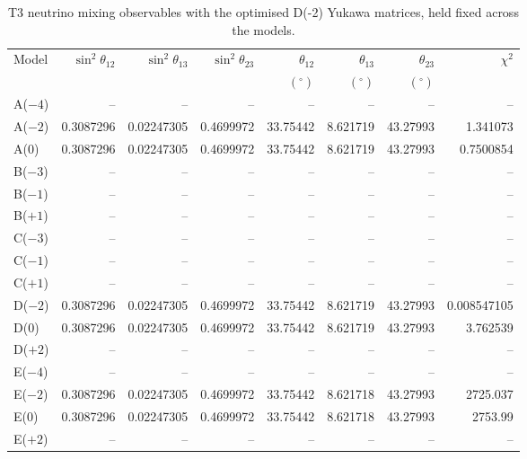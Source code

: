 \begin{table}[p]
\centering
\caption{T3 neutrino mixing observables with the optimised D(-2) Yukawa matrices, held fixed across the models.}
\label{tab:appC_Dm2_mixing}
\begingroup
\footnotesize
\setlength{\tabcolsep}{3.2pt}
\begin{tabular}{lrrrrrrr}
\hline
Model & $\sin^2\theta_{12}$ & $\sin^2\theta_{13}$ & $\sin^2\theta_{23}$ & $\theta_{12}$ & $\theta_{13}$ & $\theta_{23}$ & $\chi^2$ \\
 &  &  &  & $(^\circ)$ & $(^\circ)$ & $(^\circ)$ &  \\
\hline
A($-4$) & -- & -- & -- & -- & -- & -- & -- \\
A($-2$) & 0.3087296 & 0.02247305 & 0.4699972 & 33.75442 & 8.621719 & 43.27993 & 1.341073 \\
A($0$) & 0.3087296 & 0.02247305 & 0.4699972 & 33.75442 & 8.621719 & 43.27993 & 0.7500854 \\
B($-3$) & -- & -- & -- & -- & -- & -- & -- \\
B($-1$) & -- & -- & -- & -- & -- & -- & -- \\
B($+1$) & -- & -- & -- & -- & -- & -- & -- \\
C($-3$) & -- & -- & -- & -- & -- & -- & -- \\
C($-1$) & -- & -- & -- & -- & -- & -- & -- \\
C($+1$) & -- & -- & -- & -- & -- & -- & -- \\
D($-2$) & 0.3087296 & 0.02247305 & 0.4699972 & 33.75442 & 8.621719 & 43.27993 & 0.008547105 \\
D($0$) & 0.3087296 & 0.02247305 & 0.4699972 & 33.75442 & 8.621719 & 43.27993 & 3.762539 \\
D($+2$) & -- & -- & -- & -- & -- & -- & -- \\
E($-4$) & -- & -- & -- & -- & -- & -- & -- \\
E($-2$) & 0.3087296 & 0.02247305 & 0.4699972 & 33.75442 & 8.621718 & 43.27993 & 2725.037 \\
E($0$) & 0.3087296 & 0.02247305 & 0.4699972 & 33.75442 & 8.621718 & 43.27993 & 2753.99 \\
E($+2$) & -- & -- & -- & -- & -- & -- & -- \\
\hline
\end{tabular}
\endgroup
\end{table}
